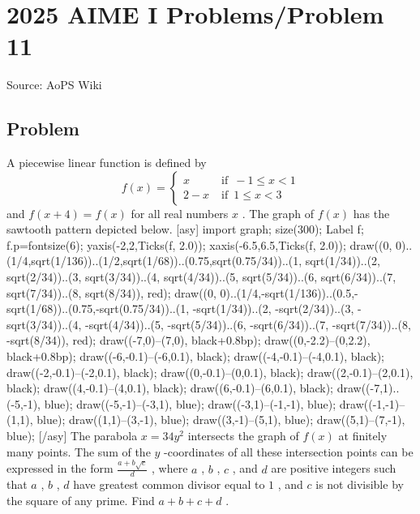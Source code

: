 \documentclass[12pt]{article}
\begin{document}
\section*{{2025 AIME I Problems/Problem 11}}
Source: AoPS Wiki

\subsection*{Problem}
A piecewise linear function is defined by \[f(x) = \begin{cases} x & \operatorname{if} ~ -1 \leq x < 1 \\ 2 - x & \operatorname{if} ~ 1 \leq x < 3\end{cases}\] and $f(x + 4) = f(x)$ for all real numbers $x$ . The graph of $f(x)$ has the sawtooth pattern depicted below. [asy] import graph; size(300); Label f; f.p=fontsize(6); yaxis(-2,2,Ticks(f, 2.0)); xaxis(-6.5,6.5,Ticks(f, 2.0)); draw((0, 0)..(1/4,sqrt(1/136))..(1/2,sqrt(1/68))..(0.75,sqrt(0.75/34))..(1, sqrt(1/34))..(2, sqrt(2/34))..(3, sqrt(3/34))..(4, sqrt(4/34))..(5, sqrt(5/34))..(6, sqrt(6/34))..(7, sqrt(7/34))..(8, sqrt(8/34)), red); draw((0, 0)..(1/4,-sqrt(1/136))..(0.5,-sqrt(1/68))..(0.75,-sqrt(0.75/34))..(1, -sqrt(1/34))..(2, -sqrt(2/34))..(3, -sqrt(3/34))..(4, -sqrt(4/34))..(5, -sqrt(5/34))..(6, -sqrt(6/34))..(7, -sqrt(7/34))..(8, -sqrt(8/34)), red); draw((-7,0)--(7,0), black+0.8bp); draw((0,-2.2)--(0,2.2), black+0.8bp); draw((-6,-0.1)--(-6,0.1), black); draw((-4,-0.1)--(-4,0.1), black); draw((-2,-0.1)--(-2,0.1), black); draw((0,-0.1)--(0,0.1), black); draw((2,-0.1)--(2,0.1), black); draw((4,-0.1)--(4,0.1), black); draw((6,-0.1)--(6,0.1), black); draw((-7,1)..(-5,-1), blue); draw((-5,-1)--(-3,1), blue); draw((-3,1)--(-1,-1), blue); draw((-1,-1)--(1,1), blue); draw((1,1)--(3,-1), blue); draw((3,-1)--(5,1), blue); draw((5,1)--(7,-1), blue); [/asy] The parabola $x = 34y^{2}$ intersects the graph of $f(x)$ at finitely many points. The sum of the $y$ -coordinates of all these intersection points can be expressed in the form $\tfrac{a + b\sqrt{c}}{d}$ , where $a$ , $b$ , $c$ , and $d$ are positive integers such that $a$ , $b$ , $d$ have greatest common divisor equal to $1$ , and $c$ is not divisible by the square of any prime. Find $a + b + c + d$ .
\end{document}
